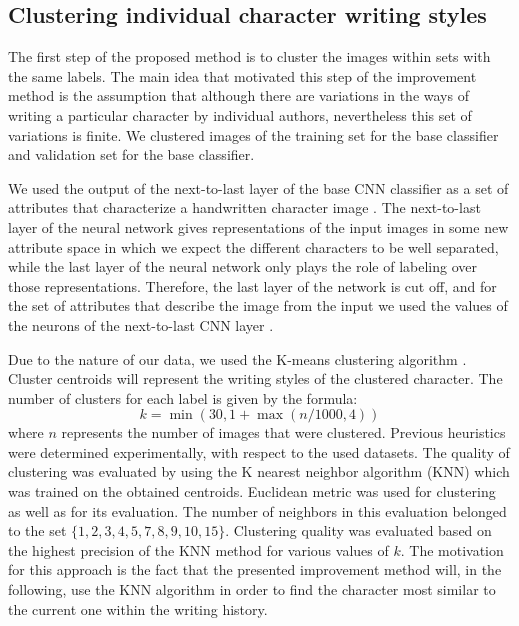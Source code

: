 \documentclass{article}
\begin{document}
\subsection{Clustering individual character writing styles}

The first step of the proposed method is to cluster the images within sets with the same labels.
The main idea that motivated this step of the improvement method is the assumption that although there are variations in the ways of writing a particular character by individual authors, nevertheless this set of variations is finite.
We clustered images of the training set for the base classifier and validation set for the base classifier.

We used the output of the next-to-last layer of the base CNN classifier as a set of attributes that characterize a handwritten character image \citep{nexttolast}.
The next-to-last layer of the neural network gives representations of the input images in some new attribute space in which we expect the different characters to be well separated,
while the last layer of the neural network only plays the role of labeling over those representations.
Therefore, the last layer of the network is cut off, and for the set of attributes that describe the image from the input we used the values of the neurons of the next-to-last CNN layer \citep{style1, style2}.

Due to the nature of our data, we used the K-means clustering algorithm \citep{kmeans}.
Cluster centroids will represent the writing styles of the clustered character.
The number of clusters for each label is given by the formula:
\begin{equation}
  k = \min(30, 1+\max(n/1000, 4))
\end{equation}
where $n$ represents the number of images that were clustered.
Previous heuristics were determined experimentally, with respect to the used datasets.
The quality of clustering was evaluated by using the K nearest neighbor algorithm (KNN) which was trained on the obtained centroids.
Euclidean metric was used for clustering as well as for its evaluation.
The number of neighbors in this evaluation belonged to the set $\{1,2,3,4,5,7,8,9,10,15\}$.
Clustering quality was evaluated based on the highest precision of the KNN method for various values of $k$.
The motivation for this approach is the fact that the presented improvement method will, in the following, use the KNN algorithm in order to find the character most similar to the current one within the writing history.
\end{document}
